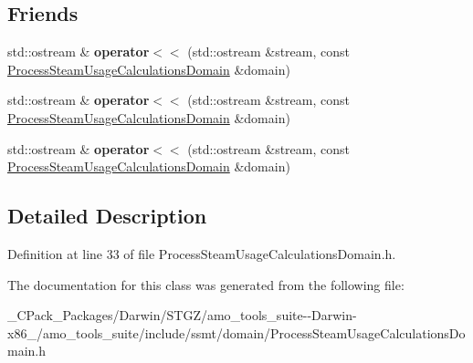 \subsection*{Friends}
\begin{DoxyCompactItemize}
\item 
\mbox{\label{class_process_steam_usage_calculations_domain_aada3a311eb3ce28005a5dc5301385198}} 
std\+::ostream \& {\bfseries operator$<$$<$} (std\+::ostream \&stream, const \hyperlink{class_process_steam_usage_calculations_domain}{Process\+Steam\+Usage\+Calculations\+Domain} \&domain)
\item 
\mbox{\label{class_process_steam_usage_calculations_domain_aada3a311eb3ce28005a5dc5301385198}} 
std\+::ostream \& {\bfseries operator$<$$<$} (std\+::ostream \&stream, const \hyperlink{class_process_steam_usage_calculations_domain}{Process\+Steam\+Usage\+Calculations\+Domain} \&domain)
\item 
\mbox{\label{class_process_steam_usage_calculations_domain_aada3a311eb3ce28005a5dc5301385198}} 
std\+::ostream \& {\bfseries operator$<$$<$} (std\+::ostream \&stream, const \hyperlink{class_process_steam_usage_calculations_domain}{Process\+Steam\+Usage\+Calculations\+Domain} \&domain)
\end{DoxyCompactItemize}


\subsection{Detailed Description}


Definition at line 33 of file Process\+Steam\+Usage\+Calculations\+Domain.\+h.



The documentation for this class was generated from the following file\+:\begin{DoxyCompactItemize}
\item 
\+\_\+\+C\+Pack\+\_\+\+Packages/\+Darwin/\+S\+T\+G\+Z/amo\+\_\+tools\+\_\+suite-\/-\/\+Darwin-\/x86\+\_/amo\+\_\+tools\+\_\+suite/include/ssmt/domain/Process\+Steam\+Usage\+Calculations\+Domain.\+h\end{DoxyCompactItemize}
